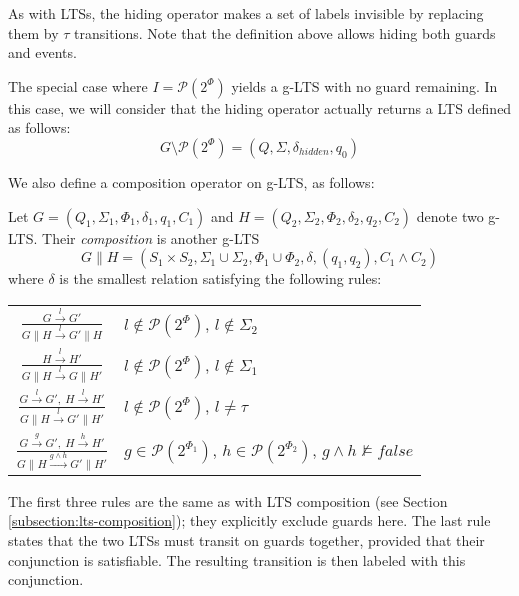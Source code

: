 As with LTSs, the hiding operator makes a set of labels invisible by replacing them by $\tau$ transitions. Note that the definition above allows hiding both guards and events. 

The special case where $I = \mathcal{P}(2^\Phi)$ yields a g-LTS with no guard remaining. In this case, we will consider that the hiding operator actually returns a LTS defined as follows:
\begin{equation*}
G \setminus \mathcal{P}(2^\Phi) = (Q,\Sigma,\delta_{hidden},q_0)
\end{equation*}

We also define a composition operator on g-LTS, as follows:

\begin{definition}
Let $G = (Q_1,\Sigma_1,\Phi_1,\delta_1,q_{1},C_{1})$ and $H = (Q_2,\Sigma_2,\Phi_2,\delta_2,q_{2},C_{2})$ denote two g-LTS. Their \emph{composition} is another g-LTS 
\begin{equation*}
G \parallel H = (S_1 \times S_2,\Sigma_1\cup\Sigma_2,\Phi_1\cup\Phi_2,\delta,(q_1,q_2),C_1 \wedge C_2)
\end{equation*}
\noindent where $\delta$ is the smallest relation satisfying the following rules:

\centering
\begin{tabular}{cl}
$\frac{\displaystyle G \stackrel{l}{\longrightarrow} G'}{\displaystyle G \parallel H \stackrel{l}{\longrightarrow} G' \parallel H}$ & $l \notin \mathcal{P}(2^\Phi)$, $l \notin \Sigma_2$ \\[20pt]

$\frac{\displaystyle H \stackrel{l}{\longrightarrow} H'}{\displaystyle G \parallel H \stackrel{l}{\longrightarrow} G \parallel H'}$ & $l \notin \mathcal{P}(2^\Phi)$, $l \notin \Sigma_1$ \\[20pt]

$\frac{\displaystyle G \stackrel{l}{\longrightarrow} G',~H \stackrel{l}{\longrightarrow} H'}{\displaystyle G \parallel H \stackrel{l}{\longrightarrow} G' \parallel H'}$ & $l \notin \mathcal{P}(2^\Phi)$, $l \neq \tau$ \\[20pt]

$\frac{\displaystyle G \stackrel{g}{\longrightarrow} G',~H \stackrel{h}{\longrightarrow} H'}{\displaystyle G \parallel H \stackrel{g \wedge h}{\longrightarrow} G' \parallel H'}$ & $g \in \mathcal{P}(2^{\Phi_1})$, $h \in \mathcal{P}(2^{\Phi_2})$, $g \wedge h \nvDash false$ 
\end{tabular}
\end{definition}

The first three rules are the same as with LTS composition (see Section \ref{subsection:lts-composition}); they explicitly exclude guards here. The last rule states that the two LTSs must transit on guards together, provided that their conjunction is satisfiable. The resulting transition is then labeled with this conjunction.

